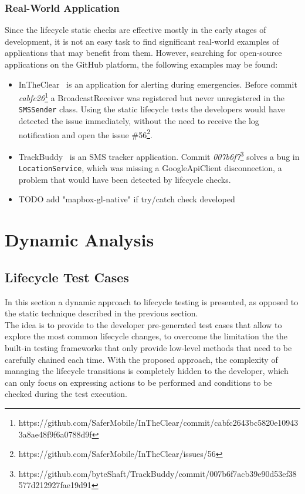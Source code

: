 \documentclass[11pt,a4paper,notitlepage]{article}
\begin{document}
{\subsubsection{Real-World Application}
Since the lifecycle static checks are effective mostly in the early stages of development, it is not an easy task to find significant real-world examples of applications that may benefit from them. However, searching for open-source applications on the GitHub platform, the following examples may be found:
\begin{itemize}
	\item InTheClear~\cite{InTheClear} is an application for alerting during emergencies. Before commit \textit{cabfc26}\footnote{https://github.com/SaferMobile/InTheClear/commit/cabfc2643bc5820e109433a8ae48f9f6a0788d9f} a BroadcastReceiver was registered but never unregistered in the \texttt{SMSSender} class. Using the static lifecycle tests the developers would have detected the issue immediately, without the need to receive the log notification and open the issue \#56\footnote{https://github.com/SaferMobile/InTheClear/issues/56}.
	\item TrackBuddy~\cite{TrackBuddy} is an SMS tracker application. Commit \textit{007b6f7}\footnote{https://github.com/byteShaft/TrackBuddy/commit/007b6f7acb39e90d53ef38577d212927fae19d91} solves a bug in \texttt{LocationService}, which was missing a GoogleApiClient disconnection, a problem that would have been detected by lifecycle checks.
	\item TODO add "mapbox-gl-native" if try/catch check developed
\end{itemize}
}


\section{Dynamic Analysis}\label{section_lifecycle_dynamic}

\subsection{Lifecycle Test Cases}
In this section a dynamic approach to lifecycle testing is presented, as opposed to the static technique described in the previous section.\medskip \\
The idea is to provide to the developer pre-generated test cases that allow to explore the most common lifecycle changes, to overcome the limitation the the built-in testing frameworks that only provide low-level methods that need to be carefully chained each time. With the proposed approach, the complexity of managing the lifecycle transitions is completely hidden to the developer, which can only focus on expressing actions to be performed and conditions to be checked during the test execution.
\end{document}
